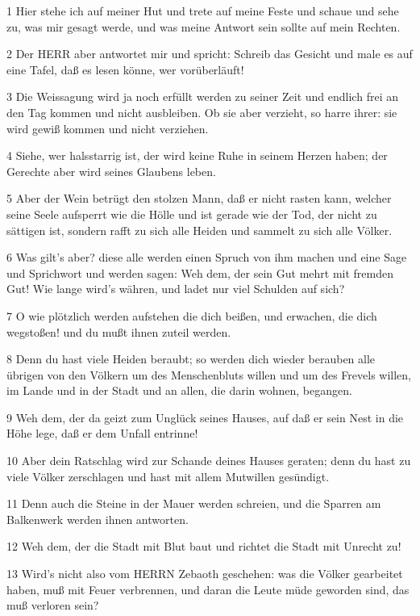 \par 1 Hier stehe ich auf meiner Hut und trete auf meine Feste und schaue und sehe zu, was mir gesagt werde, und was meine Antwort sein sollte auf mein Rechten.
\par 2 Der HERR aber antwortet mir und spricht: Schreib das Gesicht und male es auf eine Tafel, daß es lesen könne, wer vorüberläuft!
\par 3 Die Weissagung wird ja noch erfüllt werden zu seiner Zeit und endlich frei an den Tag kommen und nicht ausbleiben. Ob sie aber verzieht, so harre ihrer: sie wird gewiß kommen und nicht verziehen.
\par 4 Siehe, wer halsstarrig ist, der wird keine Ruhe in seinem Herzen haben; der Gerechte aber wird seines Glaubens leben.
\par 5 Aber der Wein betrügt den stolzen Mann, daß er nicht rasten kann, welcher seine Seele aufsperrt wie die Hölle und ist gerade wie der Tod, der nicht zu sättigen ist, sondern rafft zu sich alle Heiden und sammelt zu sich alle Völker.
\par 6 Was gilt's aber? diese alle werden einen Spruch von ihm machen und eine Sage und Sprichwort und werden sagen: Weh dem, der sein Gut mehrt mit fremden Gut! Wie lange wird's währen, und ladet nur viel Schulden auf sich?
\par 7 O wie plötzlich werden aufstehen die dich beißen, und erwachen, die dich wegstoßen! und du mußt ihnen zuteil werden.
\par 8 Denn du hast viele Heiden beraubt; so werden dich wieder berauben alle übrigen von den Völkern um des Menschenbluts willen und um des Frevels willen, im Lande und in der Stadt und an allen, die darin wohnen, begangen.
\par 9 Weh dem, der da geizt zum Unglück seines Hauses, auf daß er sein Nest in die Höhe lege, daß er dem Unfall entrinne!
\par 10 Aber dein Ratschlag wird zur Schande deines Hauses geraten; denn du hast zu viele Völker zerschlagen und hast mit allem Mutwillen gesündigt.
\par 11 Denn auch die Steine in der Mauer werden schreien, und die Sparren am Balkenwerk werden ihnen antworten.
\par 12 Weh dem, der die Stadt mit Blut baut und richtet die Stadt mit Unrecht zu!
\par 13 Wird's nicht also vom HERRN Zebaoth geschehen: was die Völker gearbeitet haben, muß mit Feuer verbrennen, und daran die Leute müde geworden sind, das muß verloren sein?
